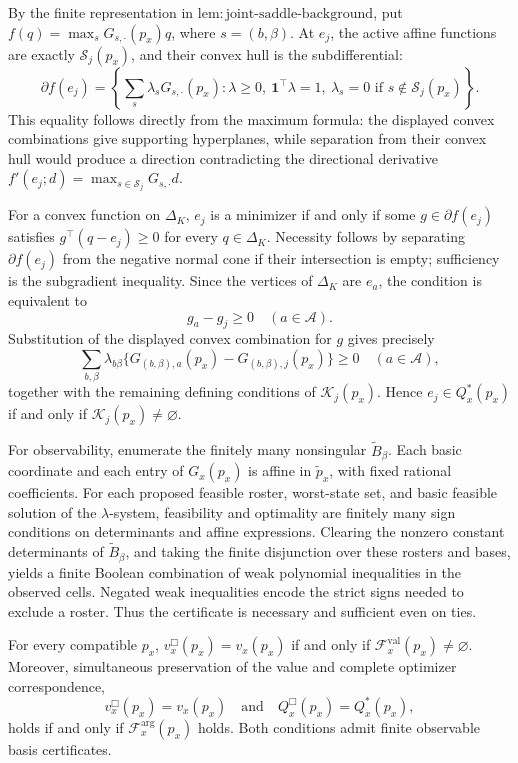 By the finite representation in \(\mathrm{lem{:}joint\text{-}saddle\text{-}background}\), put \(f(q)=\max_sG_{s,\cdot}(p_x)q\), where \(s=(b,\beta)\).  At \(e_j\), the active affine functions are exactly \(\mathcal S_j(p_x)\), and their convex hull is the subdifferential:
\[
 \partial f(e_j)=\left\{\sum_s\lambda_sG_{s,\cdot}(p_x):\lambda\geq0,\ \mathbf1^\top\lambda=1,\ \lambda_s=0\text{ if }s\notin\mathcal S_j(p_x)\right\}.
\]
This equality follows directly from the maximum formula: the displayed convex combinations give supporting hyperplanes, while separation from their convex hull would produce a direction contradicting the directional derivative \(f'(e_j;d)=\max_{s\in\mathcal S_j}G_{s,\cdot}d\).

For a convex function on \(\Delta_K\), \(e_j\) is a minimizer if and only if some \(g\in\partial f(e_j)\) satisfies \(g^\top(q-e_j)\geq0\) for every \(q\in\Delta_K\).  Necessity follows by separating \(\partial f(e_j)\) from the negative normal cone if their intersection is empty; sufficiency is the subgradient inequality.  Since the vertices of \(\Delta_K\) are \(e_a\), the condition is equivalent to
\[
 g_a-g_j\geq0\quad(a\in\mathcal A).
\]
Substitution of the displayed convex combination for \(g\) gives precisely
\[
 \sum_{b,\beta}\lambda_{b\beta}\{G_{(b,\beta),a}(p_x)-G_{(b,\beta),j}(p_x)\}\geq0
 \quad(a\in\mathcal A),
\]
together with the remaining defining conditions of \(\mathcal K_j(p_x)\).  Hence \(e_j\in Q_x^*(p_x)\) if and only if \(\mathcal K_j(p_x)\neq\varnothing\).

For observability, enumerate the finitely many nonsingular \(\widetilde B_\beta\).  Each basic coordinate and each entry of \(G_x(p_x)\) is affine in \(\widetilde p_x\), with fixed rational coefficients.  For each proposed feasible roster, worst-state set, and basic feasible solution of the \(\lambda\)-system, feasibility and optimality are finitely many sign conditions on determinants and affine expressions.  Clearing the nonzero constant determinants of \(\widetilde B_\beta\), and taking the finite disjunction over these rosters and bases, yields a finite Boolean combination of weak polynomial inequalities in the observed cells.  Negated weak inequalities encode the strict signs needed to exclude a roster.  Thus the certificate is necessary and sufficient even on ties.

For every compatible \(p_x\), \(v_x^{\Box}(p_x)=v_x(p_x)\) if and only if \(\mathcal F_x^{\mathrm{val}}(p_x)\neq\varnothing\).  Moreover, simultaneous preservation of the value and complete optimizer correspondence,
\[
 v_x^{\Box}(p_x)=v_x(p_x)\quad\text{and}\quad Q_x^{\Box}(p_x)=Q_x^*(p_x),
\]
holds if and only if \(\mathcal F_x^{\mathrm{arg}}(p_x)\) holds.  Both conditions admit finite observable basis certificates.

